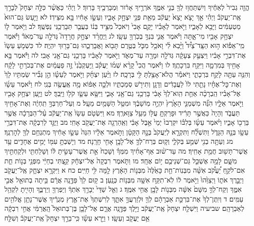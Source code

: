 \documentclass[twoside, openany, parskip=half, 11pt]{book}
\begin{document}
הֱוֵ֤ה גְבִיר֙ לְאַחֶ֔יךָ וְיִשְׁתַּחֲו֥וּ לְךָ֖ בְּנֵ֣י אִמֶּ֑ךָ אֹרְרֶ֣יךָ אָר֔וּר וּֽמְבָרְכֶ֖יךָ בָּרֽוּךְ׃ ל וַיְהִ֗י כַּאֲשֶׁ֨ר כִּלָּ֣ה יִצְחָק֮ לְבָרֵ֣ךְ אֶֽת־יַעֲקֹב֒ וַיְהִ֗י אַ֣ךְ יָצֹ֤א יָצָא֙ יַעֲקֹ֔ב מֵאֵ֥ת פְּנֵ֖י יִצְחָ֣ק אָבִ֑יו וְעֵשָׂ֣ו אָחִ֔יו בָּ֖א מִצֵּידֽוֹ׃ לא וַיַּ֤עַשׂ גַּם־הוּא֙ מַטְעַמִּ֔ים וַיָּבֵ֖א לְאָבִ֑יו וַיֹּ֣אמֶר לְאָבִ֗יו יָקֻ֤ם אָבִי֙ וְיֹאכַל֙ מִצֵּ֣יד בְּנ֔וֹ בַּעֲבֻ֖ר תְּבָרְכַ֥נִּי נַפְשֶֽׁךָ׃ לב וַיֹּ֥אמֶר ל֛וֹ יִצְחָ֥ק אָבִ֖יו מִי־אָ֑תָּה וַיֹּ֕אמֶר אֲנִ֛י בִּנְךָ֥ בְכֹֽרְךָ֖ עֵשָֽׂו׃ לג וַיֶּחֱרַ֨ד יִצְחָ֣ק חֲרָדָה֮ גְּדֹלָ֣ה עַד־מְאֹד֒ וַיֹּ֡אמֶר מִֽי־אֵפ֡וֹא ה֣וּא הַצָּֽד־צַ֩יִד֩ וַיָּ֨בֵא לִ֜י וָאֹכַ֥ל מִכֹּ֛ל בְּטֶ֥רֶם תָּב֖וֹא וָאֲבָרְכֵ֑הוּ גַּם־בָּר֖וּךְ יִהְיֶֽה׃ לד כִּשְׁמֹ֤עַ עֵשָׂו֙ אֶת־דִּבְרֵ֣י אָבִ֔יו וַיִּצְעַ֣ק צְעָקָ֔ה גְּדֹלָ֥ה וּמָרָ֖ה עַד־מְאֹ֑ד וַיֹּ֣אמֶר לְאָבִ֔יו בָּרְכֵ֥נִי גַם־אָ֖נִי אָבִֽי׃ לה וַיֹּ֕אמֶר בָּ֥א אָחִ֖יךָ בְּמִרְמָ֑ה וַיִּקַּ֖ח בִּרְכָתֶֽךָ׃ לו וַיֹּ֡אמֶר הֲכִי֩ קָרָ֨א שְׁמ֜וֹ יַעֲקֹ֗ב וַֽיַּעְקְבֵ֙נִי֙ זֶ֣ה פַעֲמַ֔יִם אֶת־בְּכֹרָתִ֣י לָקָ֔ח וְהִנֵּ֥ה עַתָּ֖ה לָקַ֣ח בִּרְכָתִ֑י וַיֹּאמַ֕ר הֲלֹא־אָצַ֥לְתָּ לִּ֖י בְּרָכָֽה׃ לז וַיַּ֨עַן יִצְחָ֜ק וַיֹּ֣אמֶר לְעֵשָׂ֗ו הֵ֣ן גְּבִ֞יר שַׂמְתִּ֥יו לָךְ֙ וְאֶת־כׇּל־אֶחָ֗יו נָתַ֤תִּי לוֹ֙ לַעֲבָדִ֔ים וְדָגָ֥ן וְתִירֹ֖שׁ סְמַכְתִּ֑יו וּלְכָ֣ה אֵפ֔וֹא מָ֥ה אֶֽעֱשֶׂ֖ה בְּנִֽי׃ לח וַיֹּ֨אמֶר עֵשָׂ֜ו אֶל־אָבִ֗יו הַֽבְרָכָ֨ה אַחַ֤ת הִֽוא־לְךָ֙ אָבִ֔י בָּרְכֵ֥נִי גַם־אָ֖נִי אָבִ֑י וַיִּשָּׂ֥א עֵשָׂ֛ו קֹל֖וֹ וַיֵּֽבְךְּ׃ לט וַיַּ֛עַן יִצְחָ֥ק אָבִ֖יו וַיֹּ֣אמֶר אֵלָ֑יו הִנֵּ֞ה מִשְׁמַנֵּ֤י הָאָ֙רֶץ֙ יִהְיֶ֣ה מֽוֹשָׁבֶ֔ךָ וּמִטַּ֥ל הַשָּׁמַ֖יִם מֵעָֽל׃ מ וְעַל־חַרְבְּךָ֣ תִֽחְיֶ֔ה וְאֶת־אָחִ֖יךָ תַּעֲבֹ֑ד וְהָיָה֙ כַּאֲשֶׁ֣ר תָּרִ֔יד וּפָרַקְתָּ֥ עֻלּ֖וֹ מֵעַ֥ל צַוָּארֶֽךָ׃ מא וַיִּשְׂטֹ֤ם עֵשָׂו֙ אֶֽת־יַעֲקֹ֔ב עַ֨ל־הַבְּרָכָ֔ה אֲשֶׁ֥ר בֵּרְכ֖וֹ אָבִ֑יו וַיֹּ֨אמֶר עֵשָׂ֜ו בְּלִבּ֗וֹ יִקְרְבוּ֙ יְמֵי֙ אֵ֣בֶל אָבִ֔י וְאַֽהַרְגָ֖ה אֶת־יַעֲקֹ֥ב אָחִֽי׃ מב וַיֻּגַּ֣ד לְרִבְקָ֔ה אֶת־דִּבְרֵ֥י עֵשָׂ֖ו בְּנָ֣הּ הַגָּדֹ֑ל וַתִּשְׁלַ֞ח וַתִּקְרָ֤א לְיַעֲקֹב֙ בְּנָ֣הּ הַקָּטָ֔ן וַתֹּ֣אמֶר אֵלָ֔יו הִנֵּה֙ עֵשָׂ֣ו אָחִ֔יךָ מִתְנַחֵ֥ם לְךָ֖ לְהׇרְגֶֽךָ׃ מג וְעַתָּ֥ה בְנִ֖י שְׁמַ֣ע בְּקֹלִ֑י וְק֧וּם בְּרַח־לְךָ֛ אֶל־לָבָ֥ן אָחִ֖י חָרָֽנָה׃ מד וְיָשַׁבְתָּ֥ עִמּ֖וֹ יָמִ֣ים אֲחָדִ֑ים עַ֥ד אֲשֶׁר־תָּשׁ֖וּב חֲמַ֥ת אָחִֽיךָ׃ מה עַד־שׁ֨וּב אַף־אָחִ֜יךָ מִמְּךָ֗ וְשָׁכַח֙ אֵ֣ת אֲשֶׁר־עָשִׂ֣יתָ לּ֔וֹ וְשָׁלַחְתִּ֖י וּלְקַחְתִּ֣יךָ מִשָּׁ֑ם לָמָ֥ה אֶשְׁכַּ֛ל גַּם־שְׁנֵיכֶ֖ם י֥וֹם אֶחָֽד׃ מו וַתֹּ֤אמֶר רִבְקָה֙ אֶל־יִצְחָ֔ק קַ֣צְתִּי בְחַיַּ֔י מִפְּנֵ֖י בְּנ֣וֹת חֵ֑ת אִם־לֹקֵ֣חַ יַ֠עֲקֹ֠ב אִשָּׁ֨ה מִבְּנֽוֹת־חֵ֤ת כָּאֵ֙לֶּה֙ מִבְּנ֣וֹת הָאָ֔רֶץ לָ֥מָּה לִּ֖י חַיִּֽים׃ כח א וַיִּקְרָ֥א יִצְחָ֛ק אֶֽל־יַעֲקֹ֖ב וַיְבָ֣רֶךְ אֹת֑וֹ וַיְצַוֵּ֙הוּ֙ וַיֹּ֣אמֶר ל֔וֹ לֹֽא־תִקַּ֥ח אִשָּׁ֖ה מִבְּנ֥וֹת כְּנָֽעַן׃ ב ק֥וּם לֵךְ֙ פַּדֶּ֣נָֽה אֲרָ֔ם בֵּ֥יתָה בְתוּאֵ֖ל אֲבִ֣י אִמֶּ֑ךָ וְקַח־לְךָ֤ מִשָּׁם֙ אִשָּׁ֔ה מִבְּנ֥וֹת לָבָ֖ן אֲחִ֥י אִמֶּֽךָ׃ ג וְאֵ֤ל שַׁדַּי֙ יְבָרֵ֣ךְ אֹֽתְךָ֔ וְיַפְרְךָ֖ וְיַרְבֶּ֑ךָ וְהָיִ֖יתָ לִקְהַ֥ל עַמִּֽים׃ ד וְיִֽתֶּן־לְךָ֙ אֶת־בִּרְכַּ֣ת אַבְרָהָ֔ם לְךָ֖ וּלְזַרְעֲךָ֣ אִתָּ֑ךְ לְרִשְׁתְּךָ֙ אֶת־אֶ֣רֶץ מְגֻרֶ֔יךָ אֲשֶׁר־נָתַ֥ן אֱלֹהִ֖ים לְאַבְרָהָֽם׃ שביעיה וַיִּשְׁלַ֤ח יִצְחָק֙ אֶֽת־יַעֲקֹ֔ב וַיֵּ֖לֶךְ פַּדֶּ֣נָֽה אֲרָ֑ם אֶל־לָבָ֤ן בֶּן־בְּתוּאֵל֙ הָֽאֲרַמִּ֔י אֲחִ֣י רִבְקָ֔ה אֵ֥ם יַעֲקֹ֖ב וְעֵשָֽׂו׃ ו וַיַּ֣רְא עֵשָׂ֗ו כִּֽי־בֵרַ֣ךְ יִצְחָק֮ אֶֽת־יַעֲקֹב֒ וְשִׁלַּ֤ח 
\end{document}
